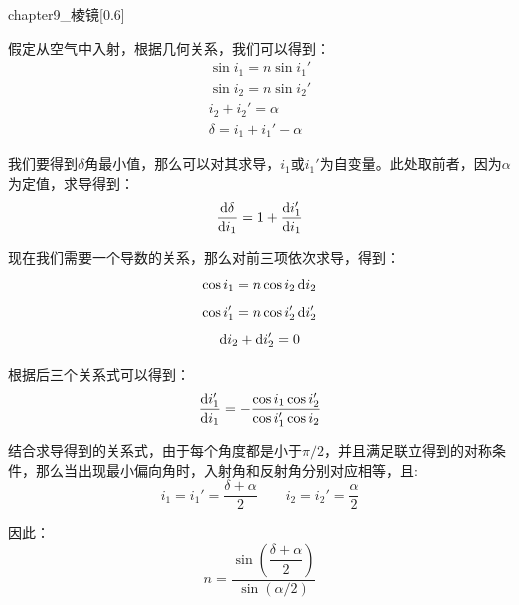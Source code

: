 \begin{prove}
  \begin{singlefigure}[棱镜]{chapter9_棱镜}[0.6]
  \end{singlefigure}
  假定从空气中入射，根据几何关系，我们可以得到：
  \begin{align*}
    \sin i_1 = n\sin i_1'\\
    \sin i_2 = n\sin i_2'\\
    i_2 + i_2' = \alpha\\
    \delta = i_1 + i_1' - \alpha
  \end{align*}

  我们要得到$\delta$角最小值，那么可以对其求导，$i_1$或$i_1'$为自变量。此处取前者，因为$\alpha$为定值，求导得到：
  \[\dfrac{\dif \delta}{\dif i_1} = 1 + \dfrac{\dif i_1'}{\dif i_1}\]

  现在我们需要一个导数的关系，那么对前三项依次求导，得到：
  \[\cos i_1 = n\cos i_2\dif{i_2}\]
  \[\cos i_1' = n\cos i_2'\dif{i_2'}\]
  \[\dif{i_2} + \dif{i_2'} = 0\]

  根据后三个关系式可以得到：
  \[\dfrac{\dif i_1'}{\dif i_1} = -\dfrac{\cos i_1\cos i_2'}{\cos i_1'\cos i_2}\]

  结合求导得到的关系式，由于每个角度都是小于$\pi/2$，并且满足联立得到的对称条件，那么当出现最小偏向角时，入射角和反射角分别对应相等，且:
  \[i_1 = i_1' = \dfrac{\delta +\alpha}{2}\qquad i_2 = i_2' = \dfrac{\alpha}{2}\]

  因此：
  \[n = \dfrac{\sin(\dfrac{\delta +\alpha}{2})}{\sin(\alpha/2)}\]
\end{prove}

